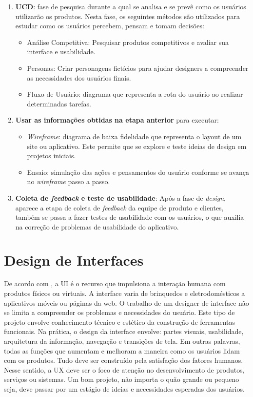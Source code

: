 \begin{enumerate}
    \item \textbf{\ac{UCD}}: fase de pesquisa durante a qual se analisa e se prevê como os usuários utilizarão os produtos. Nesta fase, os seguintes métodos são utilizados para estudar como os usuários percebem, pensam e tomam decisões:
    \begin{itemize}
        \item Análise Competitiva: Pesquisar produtos competitivos e avaliar sua interface e usabilidade. 
        \item Personas: Criar personagens fictícios para ajudar designers a compreender as necessidades dos usuários finais. 
        \item Fluxo de Usuário: diagrama que representa a rota do usuário ao realizar determinadas tarefas. 
    \end{itemize}
   \item \textbf{Usar as informações obtidas na etapa anterior} para executar:
    \begin{itemize}
        \item \textit{Wireframe}: diagrama de baixa fidelidade que representa o layout de um site ou aplicativo. Este permite que se explore e teste ideias de design em projetos iniciais. 
        \item Ensaio: simulação das ações e pensamentos do usuário conforme se avança no \textit{wireframe} passo a passo.
    \end{itemize}
   \item \textbf{Coleta de \textit{feedback} e teste de usabilidade}: Após a fase de \textit{design}, aparece a etapa de coleta de \textit{feedback} da equipe de produto e clientes, também se passa a fazer testes de usabilidade com os usuários, o que auxilia na correção de problemas de usabilidade do aplicativo.
\end{enumerate}

\section{Design de Interfaces}
\label{Design de Interfaces (UI)}
De acordo com , a \acf{UI} é o recurso que impulsiona a interação humana com produtos físicos ou virtuais. A interface varia de brinquedos e eletrodomésticos a aplicativos móveis ou páginas da web. O trabalho de um designer de interface não se limita a compreender os problemas e necessidades do usuário. Este tipo de projeto envolve conhecimento técnico e estético da construção de ferramentas funcionais. Na prática, o design da interface envolve: partes visuais, usabilidade, arquitetura da informação, navegação e transições de tela. Em outras palavras, todas as funções que aumentam e melhoram a maneira como os usuários lidam com os produtos. Tudo deve ser construído pela satisfação dos fatores humanos. Nesse sentido, a \acf{UX} deve ser o foco de atenção no desenvolvimento de produtos, serviços ou sistemas. Um bom projeto, não importa o quão grande ou pequeno seja, deve passar por um estágio de ideias e necessidades esperadas dos usuários.


